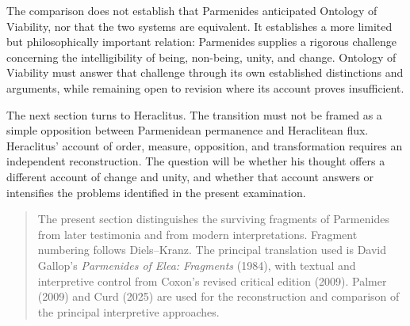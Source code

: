 
The comparison does not establish
that Parmenides anticipated
Ontology of Viability, nor that
the two systems are equivalent.
It establishes a more limited
but philosophically important
relation: Parmenides supplies
a rigorous challenge concerning
the intelligibility of being,
non-being, unity, and change.
Ontology of Viability must
answer that challenge through
its own established distinctions
and arguments, while remaining
open to revision where its
account proves insufficient.


The next section turns to Heraclitus.
The transition must not be framed
as a simple opposition between
Parmenidean permanence and
Heraclitean flux. Heraclitus'
account of order, measure,
opposition, and transformation
requires an independent
reconstruction. The question
will be whether his thought
offers a different account
of change and unity, and
whether that account answers
or intensifies the problems
identified in the present
examination.


\begin{quote}
\small
The present section distinguishes the surviving fragments
of Parmenides from later testimonia and from modern
interpretations. Fragment numbering follows Diels--Kranz.
The principal translation used is David Gallop's
\textit{Parmenides of Elea: Fragments} (1984), with textual
and interpretive control from Coxon's revised critical
edition (2009). Palmer (2009) and Curd (2025) are used
for the reconstruction and comparison of the principal
interpretive approaches.
\end{quote}

